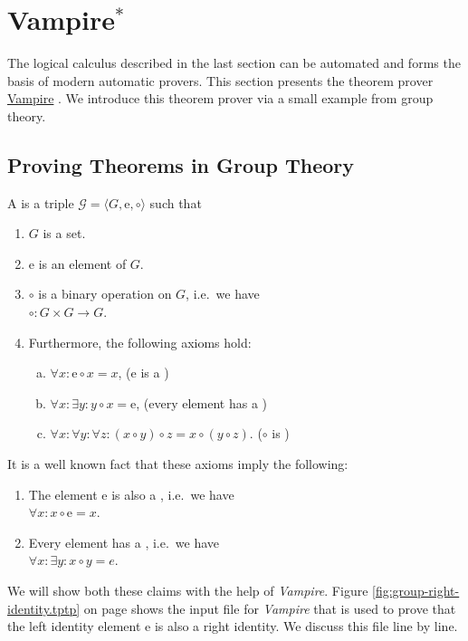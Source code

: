 \section{Vampire$^*$ }
The logical calculus described in the last section can be automated and forms the basis of modern
automatic provers.  This section presents the theorem prover \href{https://vprover.github.io}{Vampire}
\cite{kovacs:2013}.  We introduce this theorem prover via a small example from group theory.

\subsection{Proving Theorems in Group Theory}
A  is a triple $\mathcal{G} = \langle G, \mathrm{e}, \circ \rangle$
such that
\begin{enumerate}
\item $G$ is a set.
\item $\mathrm{e}$ is an element of $G$.
\item $\circ$ is a binary operation on $G$, i.e.~we have
      \\[0.2cm]
      \hspace*{1.3cm}
      $\circ: G \times G \rightarrow G$.
\item Furthermore, the following axioms hold:
      \begin{enumerate}[(a)]
      \item $\forall x: \mathrm{e} \circ x = x$, \hspace*{\fill} ($\mathrm{e}$ is a )
      \item $\forall x: \exists y: y \circ x = \mathrm{e}$, \hspace*{\fill} (every element has a ) 
      \item $\forall x: \forall y: \forall z: (x \circ y) \circ z = x \circ (y \circ z)$. \hspace*{\fill} ($\circ$ is )
      \end{enumerate}
\end{enumerate}
It is a well known fact that these axioms imply the following:
\begin{enumerate}
\item The element $\mathrm{e}$ is also a , i.e.~we have
      \\[0.2cm]
      \hspace*{1.3cm}
      $\forall x: x \circ \mathrm{e} = x$.
\item Every element has a , i.e.~we have
      \\[0.2cm]
      \hspace*{1.3cm}
      $\forall x: \exists y: x \circ y = e$.
\end{enumerate}
We will show both these claims with the help of \textsl{Vampire}.  Figure \ref{fig:group-right-identity.tptp} on page
\pageref{fig:group-right-identity.tptp} shows the input file for \textsl{Vampire} that is used to prove that
the left identity element $\mathrm{e}$ is also a right identity.  We discuss this file line by line.

